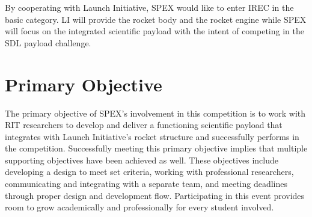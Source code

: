 \documentclass[conference]{IEEEtran} %
\begin{document}
By cooperating with Launch Initiative, SPEX would like to enter IREC in the basic category. LI will provide the rocket body and the rocket engine while SPEX will focus on the
integrated scientific payload with the intent of competing in the SDL payload challenge.

\section{Primary Objective}
\label{sec:primary-obj}
The primary objective of SPEX's involvement in this competition is to work with RIT researchers to develop and deliver a functioning scientific payload
that integrates with Launch Initiative's rocket structure and successfully performs in the competition. Successfully meeting this primary objective implies
that multiple supporting objectives have been achieved as well. These objectives include developing a design to meet set criteria, working with
professional researchers, communicating and integrating with a separate team, and meeting deadlines through proper design and development flow. Participating
in this event provides room to grow academically and professionally for every student involved.


\end{document}

